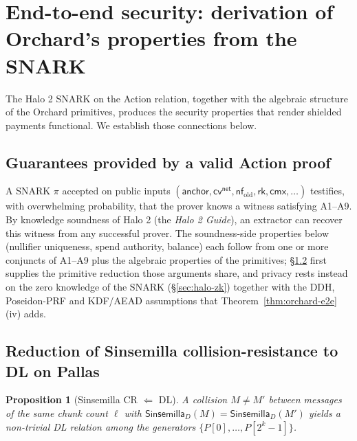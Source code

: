 \documentclass[11pt,a4paper]{article}
\newtheorem{proposition}[theorem]{Proposition}
\theoremstyle{definition}
\newcommand{\nfsym}{\mathsf{nf}}
\newcommand{\cmx}{\mathsf{cmx}}
\newcommand{\cvsym}{\mathsf{cv}}
\newcommand{\rk}{\mathsf{rk}}
\newcommand{\Sinsemilla}{\ensuremath{\mathsf{Sinsemilla}}}
\begin{document}
\section{End-to-end security: derivation of Orchard's properties from the SNARK}\label{sec:e2e-sec}

The Halo 2 SNARK on the Action relation, together with the algebraic structure of
the Orchard primitives, produces the security properties that render shielded
payments functional. We establish those connections below.

\subsection{Guarantees provided by a valid Action proof}\label{sec:what-proof-gives}

A SNARK $\pi$ accepted on public inputs
$(\mathsf{anchor}, \cvsym^{\mathsf{net}}, \nfsym_{\mathrm{old}}, \rk, \cmx, \ldots)$
testifies, with overwhelming probability, that the prover knows a
witness satisfying A1--A9. By knowledge soundness
of Halo 2 (the \emph{Halo 2 Guide}), an extractor can
recover this witness from any successful prover. The soundness-side
properties below (nullifier uniqueness, spend authority, balance) each
follow from one or more conjuncts of A1--A9 plus the algebraic properties
of the primitives; \S\ref{sec:sins-cr} first supplies the primitive
reduction those arguments share, and privacy rests instead on the zero
knowledge of the SNARK (\S\ref{sec:halo-zk}) together with the DDH,
Poseidon-PRF and KDF/AEAD assumptions that
Theorem~\ref{thm:orchard-e2e}(iv) adds.

\subsection{Reduction of Sinsemilla collision-resistance to DL on Pallas}\label{sec:sins-cr}

\begin{proposition}[Sinsemilla CR $\Leftarrow$ DL]\label{prop:sins-cr}
A collision $M \ne M'$ between messages of the same chunk count $\ell$
with $\Sinsemilla_D(M) = \Sinsemilla_D(M')$
yields a non-trivial DL relation among the generators
$\{P[0], \dots, P[2^k - 1]\}$.
\end{proposition}
\end{document}
